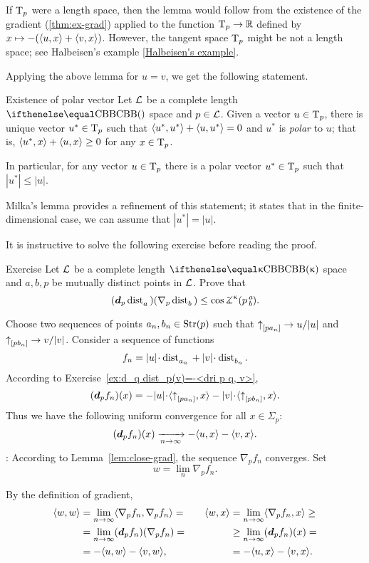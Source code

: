 If $\text{\rm T}_p$ were a length space, then the lemma would follow from the existence  of the gradient (\ref{thm:ex-grad}) applied to the function $\T_p\to \RR$ defined by $x\mapsto -(\<u,x\>+\<v,x\>)$.
However, the tangent space $\text{\rm T}_p$ might be not a length space; see  Halbeisen's example \ref{Halbeisen's example}.


Applying the above lemma for $u=v$, we get the following statement.

\begin{thm}{Existence of polar vector}\label{cor:polar}
Let $\mathcal{L}$ be a complete length $\Alex{}$ space 
and $p\in \spc{L}$. 
Given a vector $u\in \T_p$,  there is unique vector $u^*\in\T_p$ such that $\langle u^*,u^*\rangle+\langle u,u^*\rangle= 0$ and
$u^*$ is \emph{polar} to $u$;
that is,
 $\<u^*,x\>+\<u,x\>\ge 0$ for any $x\in \T_p$.

In particular, for any vector $u\in \T_p$ there is a polar vector $u^*\in\T_p$ such that
$|u^*|\le |u|$.
\end{thm}

Milka's lemma %
provides a refinement of this statement;
it states that in the finite-dimensional case, we can assume that $|u^*|= |u|$. 

It is instructive to solve the following exercise before reading the proof.

\begin{thm}{Exercise}\label{ex:d dist(grad)<0}
Let $\mathcal{L}$ be a complete length $\Alex\kappa$ space and $a,b,p$
be mutually distinct points in $\mathcal{L}$.
Prove that 
\[(\dd_p\distfun{a}{}{})(\nabla_p\distfun{b}{}{})
\le\cos\angk\kappa pab.\]
\end{thm}

Choose two sequences of points $a_n,b_n\in \Str(p)$ such that $\dir{p}{a_n}\to u/|u|$ and $\dir{p}{b_n}\to v/|v|$.
Consider a sequence of functions 
\[f_n=|u|\cdot\distfun{a_n}{}{}+|v|\cdot\distfun{b_n}{}{}.\]
According to Exercise~\ref{ex:d_q dist_p(v)=-<dri p q, v>}, 
\[(\dd_pf_n)(x)=-|u|\cdot\<\dir{p}{a_n},x\>-|v|\cdot\<\dir{p}{b_n},x\>.\]
Thus we have the following uniform convergence for all $x\in\Sigma_p$:
\[(\dd_pf_n)(x)\xto[n\to\infty]{}-\<u,x\>-\<v,x\>.\]:
According to Lemma~\ref{lem:close-grad}, 
the sequence $\nabla_pf_n$ converges.
Set 
\[w=\lim_n\nabla_pf_n.\]

By the definition of gradient,
\[\begin{aligned}
\<w,w\>&=\lim_{n\to\infty}\<\nabla_pf_n,\nabla_pf_n\>=
&&&%
\<w,x\>&=\lim_{n\to\infty}\<\nabla_pf_n,x\>\ge
\\%
&=\lim_{n\to\infty}(\dd_p f_n)(\nabla_p f_n)
=
&&&%
&\ge
\lim_{n\to\infty}(\dd_pf_n)(x)
=
\\%
&=-\<u,w\>-\<v,w\>,
&&&%
&=-\<u,x\>-\<v,x\>.
\end{aligned}\]
\qedsf













